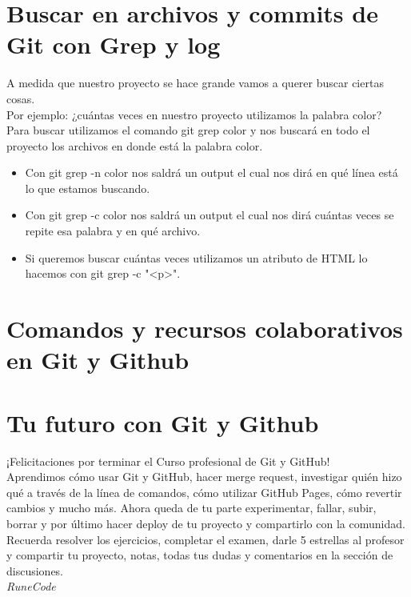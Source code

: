 \documentclass{article}
\begin{document}
\section{Buscar en archivos y commits de Git con Grep y log}%
A medida que nuestro proyecto se hace grande vamos a querer buscar ciertas
cosas.\\

Por ejemplo: ¿cuántas veces en nuestro proyecto utilizamos la palabra color?\\

Para buscar utilizamos el comando git grep color y nos buscará en todo el
proyecto los archivos en donde está la palabra color.

\begin{itemize}
  \item Con git grep -n color nos saldrá un output el cual nos dirá en qué
    línea está lo que estamos buscando.
  \item Con git grep -c color nos saldrá un output el cual nos dirá cuántas
    veces se repite esa palabra y en qué archivo.
  \item Si queremos buscar cuántas veces utilizamos un atributo de HTML lo
    hacemos con git grep -c "<p>".
\end{itemize}


\section{Comandos y recursos colaborativos en Git y Github}%


\section{Tu futuro con Git y Github}%
¡Felicitaciones por terminar el Curso profesional de Git y GitHub!\\

Aprendimos cómo usar Git y GitHub, hacer merge request, investigar quién hizo
qué a través de la línea de comandos, cómo utilizar GitHub Pages, cómo revertir
cambios y mucho más. Ahora queda de tu parte experimentar, fallar, subir,
borrar y por último hacer deploy de tu proyecto y compartirlo con la
comunidad.\\

Recuerda resolver los ejercicios, completar el examen, darle 5 estrellas al
profesor y compartir tu proyecto, notas, todas tus dudas y comentarios en la
sección de discusiones.\\
































\vspace{2cm}
\LARGE\textit{RuneCode}
\end{document}
